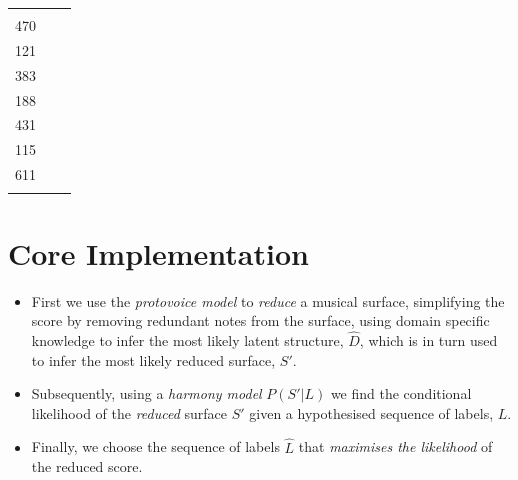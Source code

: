 \documentclass[12pt,a4paper,twoside,openright]{report}
\theoremstyle{definition}
\begin{document}
{\begin{table}[!t]
\begin{tabularx}{\textwidth}{l X c}
\begin{minipage}[t]{8cm}
  \end{minipage} & 
  \begin{minipage}[t]{0.5cm}
    2272
    \vspace{0.1\DTbaselineskip}\\
    470\\
    \vspace{\DTbaselineskip}
    121\\
    \vspace{\DTbaselineskip}
    383\\
    \vspace{1.8\DTbaselineskip}
    188\\
    \vspace{3.7\DTbaselineskip}
    431\\
    \vspace{3\DTbaselineskip}
    115\\
    \vspace{2.5\DTbaselineskip}
    611\\
  \end{minipage}
\end{tabularx}
\end{table}
}


\section{Core Implementation}


\begin{itemize}
  \item First we use the \textit{protovoice model} to \textit{reduce} a musical surface, simplifying the score by removing redundant notes from the surface, using domain specific knowledge to infer the most likely latent structure, $\hat{D}$, which is in turn used to infer the most likely reduced surface, $S'$.
  \item Subsequently, using a \textit{harmony model} $P(S'|L)$ we find the conditional likelihood of the \textit{reduced} surface $S'$ given a hypothesised sequence of labels, $L$.
  \item Finally, we choose the sequence of labels $\hat{L}$ that \textit{maximises the likelihood} of the reduced score.
\end{itemize}
\end{document}

